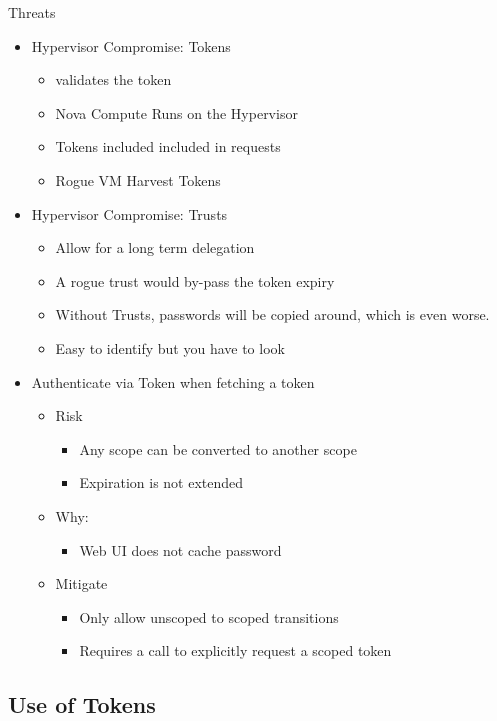 \documentclass{beamer}
\begin{document}
\begin{frame}{Threats}
  \begin{itemize}
  \item Hypervisor Compromise: Tokens
    \begin{itemize}
    \item validates the token
    \item Nova Compute Runs on the Hypervisor
    \item Tokens included included in requests
    \item Rogue VM Harvest Tokens
    \end{itemize}
  \item Hypervisor Compromise: Trusts
    \begin{itemize}
    \item Allow for a long term delegation
    \item A rogue trust would by-pass the token expiry
    \item Without Trusts, passwords will be copied around, which is even worse.
    \item Easy to identify but you have to look
    \end{itemize}
  \item Authenticate via Token when fetching a token
    \begin{itemize}
    \item Risk
      \begin{itemize}
      \item Any scope can be converted to another scope
      \item Expiration is not extended
      \end{itemize}
    \item Why:
      \begin{itemize}
      \item Web UI does not cache password
      \end{itemize}
    \item Mitigate
      \begin{itemize}
      \item Only allow unscoped to scoped transitions
      \item Requires a call to explicitly request a scoped token
      \end{itemize}
    \end{itemize}
  \end{itemize}
\end{frame}

\subsection {Use of Tokens }
\end{document}
